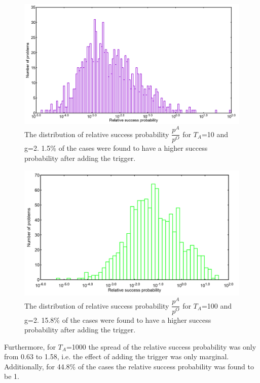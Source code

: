 \documentclass[../main.tex]{subfiles}
\begin{document}
\begin{figure}[H]
\centering 
\includegraphics[scale=0.25]{A_T10_g2.png}
\caption{The distribution of relative success probability $\dfrac{p^A}{p^O}$ for $T_A$=10 and g=2. 1.5\% of the cases were found to have a higher success probability after adding the trigger.}
\label{fig:a35}
\end{figure}
\begin{figure}[H]
\centering 
\includegraphics[scale=0.25]{A_T100_g2.png}
\caption{The distribution of relative success probability $\dfrac{p^A}{p^O}$ for $T_A$=100 and g=2. 15.8\% of the cases were found to have a higher success probability after adding the trigger. }
\label{fig:a36}
\end{figure}
Furthermore, for $T_A$=1000 the spread of the relative success probability was only from 0.63 to 1.58, i.e. the effect of adding the trigger was only marginal. Additionally, for 44.8\% of the cases the relative success probability was found to be 1.
\end{document}
